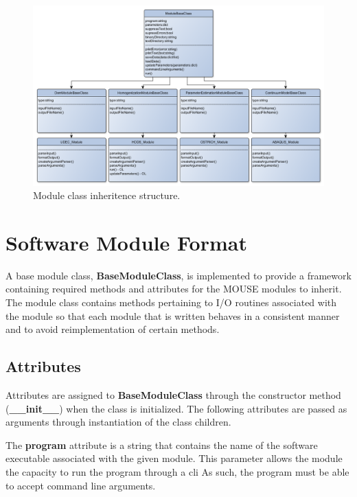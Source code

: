 \begin{figure}
\begin{center}
\includegraphics[width=\textwidth]{figures/Chapter4/ModuleClassUML}
\caption{{\label{fig:moduleClass} Module class inheritence structure.%
}}
\end{center}
\end{figure}

\section{Software Module Format}

A base module class, \textbf{BaseModuleClass}, is implemented to provide a framework containing required methods and attributes for the MOUSE modules to inherit. The module class contains methods pertaining to I/O routines associated with the module so that each module that is written behaves in a consistent manner and to avoid reimplementation of certain methods. 

\subsection{Attributes}

Attributes are assigned to \textbf{BaseModuleClass} through the constructor method (\textbf{\_\_init\_\_}) when the class is initialized. The following attributes are passed as arguments through instantiation of the class children. 

The \textbf{program} attribute is a string that contains the name of the software executable associated with the given module. This parameter allows the module the capacity to run the program through a \acrfull{cli} As such, the program must be able to accept command line arguments.

